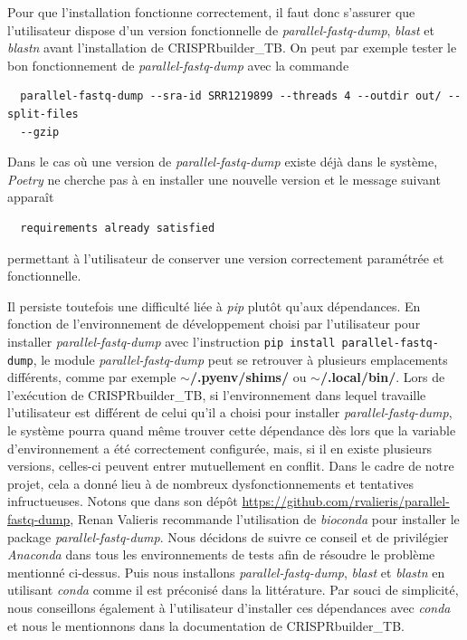 \documentclass[twoside,a4paper,11pt,frenchb,openany]{report}
\begin{document}
Pour que l'installation fonctionne correctement, il faut donc s'assurer que l'utilisateur dispose d'un version fonctionnelle de \textit{parallel-fastq-dump}, \textit{blast} et \textit{blastn} avant l'installation de CRISPRbuilder\_TB. On peut par exemple tester le bon fonctionnement de \textit{parallel-fastq-dump} avec la commande 

\begin{verbatim}
  parallel-fastq-dump --sra-id SRR1219899 --threads 4 --outdir out/ --split-files 
  --gzip
\end{verbatim} 

Dans le cas où une version de \textit{parallel-fastq-dump} existe déjà dans le système, \textit{Poetry} ne cherche pas à en installer une nouvelle version et le message suivant apparaît

\begin{verbatim}
  requirements already satisfied
\end{verbatim}

permettant à l'utilisateur de conserver une version correctement paramétrée et fonctionnelle.

Il persiste toutefois une difficulté liée à \textit{pip} plutôt qu'aux dépendances. En fonction de l'environnement de développement choisi par l'utilisateur pour installer \textit{parallel-fastq-dump} avec l'instruction \texttt{pip install parallel-fastq-dump}, le module \textit{parallel-fastq-dump} peut se retrouver à plusieurs emplacements différents, comme par exemple \textbf{$\sim$/.pyenv/shims/} ou \textbf{$\sim$/.local/bin/}. Lors de l'exécution de CRISPRbuilder\_TB, si l'environnement dans lequel travaille l'utilisateur est différent de celui qu'il a choisi pour installer \textit{parallel-fastq-dump}, le système pourra quand même trouver cette dépendance dès lors que la variable d'environnement a été correctement configurée, mais, si il en existe plusieurs versions, celles-ci peuvent entrer mutuellement en conflit. Dans le cadre de notre projet, cela a donné lieu à de nombreux dysfonctionnements et tentatives infructueuses. Notons que dans son dépôt \url{https://github.com/rvalieris/parallel-fastq-dump}, Renan Valieris recommande l'utilisation de \textit{bioconda} pour installer le package \textit{parallel-fastq-dump}. Nous décidons de suivre ce conseil et de privilégier \textit{Anaconda} dans tous les environnements de tests afin de résoudre le problème mentionné ci-dessus. Puis nous installons \textit{parallel-fastq-dump}, \textit{blast} et \textit{blastn} en utilisant \textit{conda} comme il est préconisé dans la littérature. Par souci de simplicité, nous conseillons également à l'utilisateur d'installer ces dépendances avec \textit{conda} et nous le mentionnons dans la documentation de CRISPRbuilder\_TB.
\end{document}
